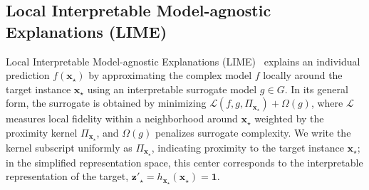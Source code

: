 \documentclass[pdflatex,sn-mathphys-num]{sn-jnl}
\theoremstyle{thmstyleone}
\theoremstyle{thmstyletwo}%
\theoremstyle{thmstylethree}%
\begin{document}
\subsection{Local Interpretable Model-agnostic Explanations (LIME)}
Local Interpretable Model-agnostic Explanations (LIME)~\cite{ribeiro2016} explains an individual prediction $f(\mathbf{x}_\star)$ by approximating the complex model $f$ locally around the target instance $\mathbf{x}_\star$ using an interpretable surrogate model $g \in G$. In its general form, the surrogate is obtained by minimizing $\mathcal{L}(f, g, \Pi_{\mathbf{x}_\star}) + \Omega(g)$, where $\mathcal{L}$ measures local fidelity within a neighborhood around $\mathbf{x}_\star$ weighted by the proximity kernel $\Pi_{\mathbf{x}_\star}$, and $\Omega(g)$ penalizes surrogate complexity. We write the kernel subscript uniformly as $\Pi_{\mathbf{x}_\star}$, indicating proximity to the target instance $\mathbf{x}_\star$; in the simplified representation space, this center corresponds to the interpretable representation of the target, $\mathbf{z}'_\star = h_{\mathbf{x}_\star}(\mathbf{x}_\star) = \mathbf{1}$. 
\end{document}
